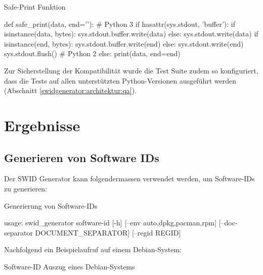 \begin{listing}[h]
\caption{Safe-Print Funktion}
\label{safeprint}
\begin{pythoncode}
def safe_print(data, end='\n'):
    # Python 3
    if hasattr(sys.stdout, 'buffer'):
        if isinstance(data, bytes):
            sys.stdout.buffer.write(data)
        else:
            sys.stdout.write(data)
        if isinstance(end, bytes):
            sys.stdout.buffer.write(end)
        else:
            sys.stdout.write(end)
        sys.stdout.flush()
    # Python 2
    else:
        print(data, end=end)
\end{pythoncode}
\end{listing}

Zur Sicherstellung der Kompatibilität wurde die Test Suite zudem so
konfiguriert, dass die Tests auf allen unterstützten Python-Versionen ausgeführt
werden (Abschnitt \ref{swidgenerator:architektur:qa}).


\section{Ergebnisse}

\subsection{Generieren von Software IDs}

Der SWID Generator kann folgendermassen verwendet werden, um Software-IDs zu
generieren:

\begin{listing}[H]
\caption{Generierung von Software-IDs}
\begin{textcode}
usage: swid_generator software-id [-h] [--env {auto,dpkg,pacman,rpm}]
                                  [--doc-separator DOCUMENT_SEPARATOR]
                                  [--regid REGID]
\end{textcode}
\end{listing}

Nachfolgend ein Beispielaufruf auf einem Debian-System:

\begin{listing}[H]
\caption{Software-ID Auszug eines Debian-Systems}
\end{listing}

